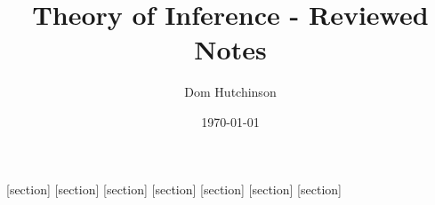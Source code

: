 \documentclass[11pt,a4paper]{article}
\begin{document}
\pagestyle{fancy}
\setlength\parindent{0pt}
\allowdisplaybreaks

\renewcommand{\headrulewidth}{0pt}

\title{Theory of Inference - Reviewed Notes}
\author{Dom Hutchinson}
\date{\today}
\maketitle

\fancyhead[R]{\today}

[section]
[section]
[section]
[section]
[section]
[section]
[section]

\newcommand{\dotprod}[0]{\boldsymbol{\cdot}}
\newcommand{\cosech}[0]{\mathrm{cosech}\ }
\newcommand{\cosec}[0]{\mathrm{cosec}\ }
\newcommand{\sech}[0]{\mathrm{sech}\ }
\newcommand{\prob}[0]{\mathbb{P}}
\newcommand{\nats}[0]{\mathbb{N}}
\newcommand{\cov}[0]{\mathrm{Cov}}
\newcommand{\var}[0]{\mathrm{Var}}
\newcommand{\expect}[0]{\mathbb{E}}
\newcommand{\reals}[0]{\mathbb{R}}
\newcommand{\integers}[0]{\mathbb{Z}}
\newcommand{\indicator}[0]{\mathds{1}}
\newcommand{\nb}[0]{\textit{N.B.} }
\newcommand{\ie}[0]{\textit{i.e.} }
\newcommand{\eg}[0]{\textit{e.g.} }
\newcommand{\X}[0]{\textbf{X}}
\newcommand{\x}[0]{\textbf{x}}
\newcommand{\iid}[0]{\overset{\text{iid}}{\sim}}
\newcommand{\proved}[0]{$\hfill\square$\\}
\newcommand{\argmin}[0]{\text{argmin}}
\newcommand{\argmax}[0]{\text{argmax}}
\end{document}
